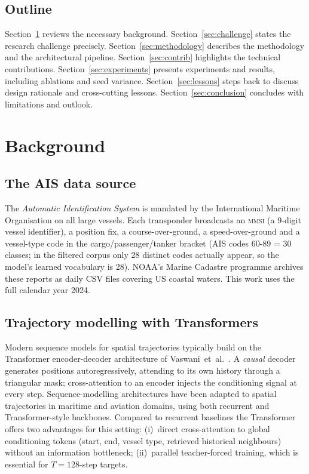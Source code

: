 \documentclass[oneside, a4paper, onecolumn, 11pt]{article}
\begin{document}
\subsection{Outline}

Section~\ref{sec:background} reviews the necessary background.
Section~\ref{sec:challenge} states the research challenge precisely.
Section~\ref{sec:methodology} describes the methodology and the
architectural pipeline.
Section~\ref{sec:contrib} highlights the technical contributions.
Section~\ref{sec:experiments} presents experiments and results,
including ablations and seed variance.
Section~\ref{sec:lessons} steps back to discuss design rationale and
cross-cutting lessons.
Section~\ref{sec:conclusion} concludes with limitations and outlook.

\section{Background}\label{sec:background}

\subsection{The AIS data source}

The \emph{Automatic Identification System} is mandated by the
International Maritime Organisation on all large vessels.  Each
transponder broadcasts an \textsc{mmsi} (a 9-digit vessel identifier),
a position fix, a course-over-ground, a speed-over-ground and a
vessel-type code in the cargo/passenger/tanker bracket
(AIS codes 60-89 = 30 classes; in the filtered corpus only 28 distinct
codes actually appear, so the model's learned vocabulary is 28).
NOAA's Marine
Cadastre programme archives these reports as daily CSV files covering
US coastal waters.  This work uses the full calendar year 2024.

\subsection{Trajectory modelling with Transformers}

Modern sequence models for spatial trajectories typically build on the
Transformer encoder-decoder architecture of
Vaswani~et~al.~\cite{vaswani2017attention}.
A \emph{causal} decoder generates positions autoregressively, attending
to its own history through a triangular mask; cross-attention to an
encoder injects the conditioning signal at every step.
Sequence-modelling architectures have been adapted to spatial
trajectories in maritime \cite{nguyen2020transformer} and aviation
\cite{capobianco2021lstm} domains, using both recurrent and
Transformer-style backbones.  Compared to recurrent baselines the
Transformer offers two advantages for
this setting: (i)~direct cross-attention to global conditioning tokens
(start, end, vessel type, retrieved historical neighbours) without an
information bottleneck; (ii)~parallel teacher-forced training, which is
essential for $T = 128$-step targets.
\end{document}
